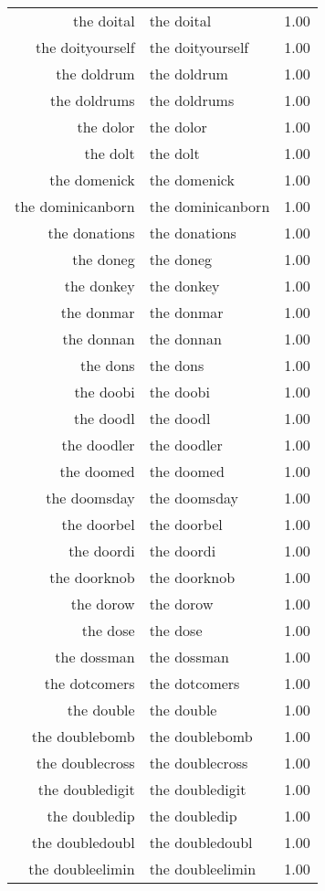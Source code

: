 \begin{table}[ht]
\begin{tabular}{rlr}
  the doital & the doital & 1.00 \\ 
  the doityourself & the doityourself & 1.00 \\ 
  the doldrum & the doldrum & 1.00 \\ 
  the doldrums & the doldrums & 1.00 \\ 
  the dolor & the dolor & 1.00 \\ 
  the dolt & the dolt & 1.00 \\ 
  the domenick & the domenick & 1.00 \\ 
  the dominicanborn & the dominicanborn & 1.00 \\ 
  the donations & the donations & 1.00 \\ 
  the doneg & the doneg & 1.00 \\ 
  the donkey & the donkey & 1.00 \\ 
  the donmar & the donmar & 1.00 \\ 
  the donnan & the donnan & 1.00 \\ 
  the dons & the dons & 1.00 \\ 
  the doobi & the doobi & 1.00 \\ 
  the doodl & the doodl & 1.00 \\ 
  the doodler & the doodler & 1.00 \\ 
  the doomed & the doomed & 1.00 \\ 
  the doomsday & the doomsday & 1.00 \\ 
  the doorbel & the doorbel & 1.00 \\ 
  the doordi & the doordi & 1.00 \\ 
  the doorknob & the doorknob & 1.00 \\ 
  the dorow & the dorow & 1.00 \\ 
  the dose & the dose & 1.00 \\ 
  the dossman & the dossman & 1.00 \\ 
  the dotcomers & the dotcomers & 1.00 \\ 
  the double & the double & 1.00 \\ 
  the doublebomb & the doublebomb & 1.00 \\ 
  the doublecross & the doublecross & 1.00 \\ 
  the doubledigit & the doubledigit & 1.00 \\ 
  the doubledip & the doubledip & 1.00 \\ 
  the doubledoubl & the doubledoubl & 1.00 \\ 
  the doubleelimin & the doubleelimin & 1.00 \\ 

\end{tabular}
\end{table}
